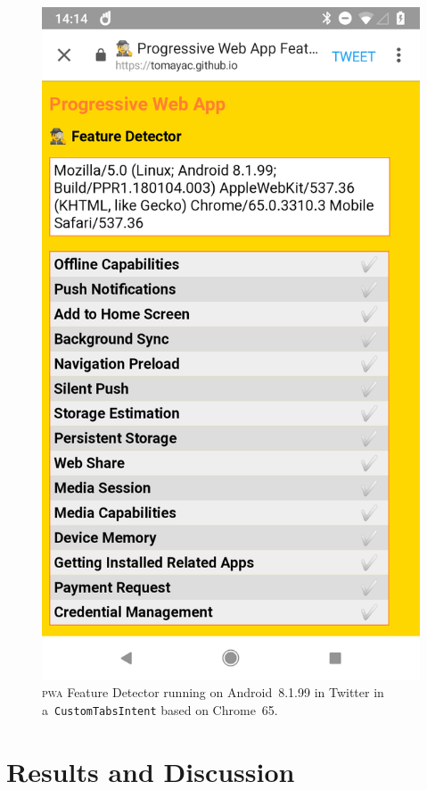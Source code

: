 \documentclass[sigconf]{acmart}
\begin{document}
\begin{figure}[hbt]
  \centering
  \includegraphics[width=\columnwidth,frame]{pwa-feature-detector-twitter-android-chrome65}
  \caption[\textsc{pwa} Feature Detector running in Twitter.]{
    \textsc{pwa} Feature Detector running on Android~8.1.99 in Twitter
    in a~\texttt{CustomTabsIntent} based on Chrome~65.}
  \label{fig:wechat-android-chrome65}
\end{figure}

\section{Results and Discussion}
\label{sec:results-and-discussion}
\end{document}
